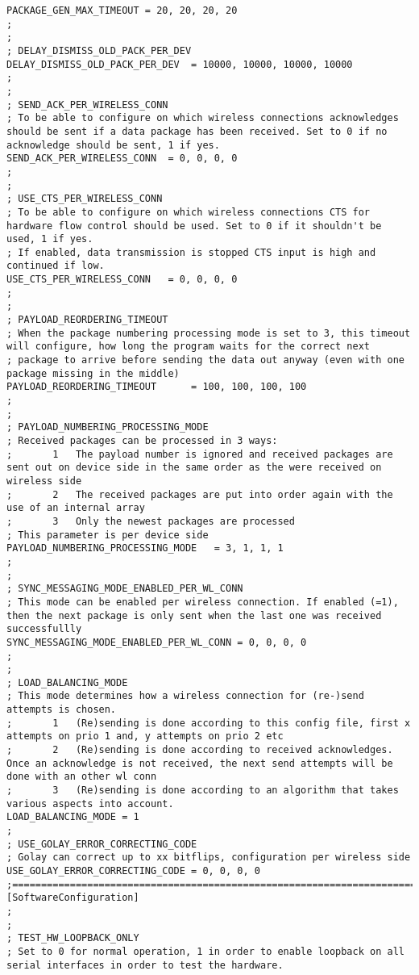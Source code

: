 \begin{lstlisting}
PACKAGE_GEN_MAX_TIMEOUT	= 20, 20, 20, 20
;
;
; DELAY_DISMISS_OLD_PACK_PER_DEV
DELAY_DISMISS_OLD_PACK_PER_DEV	= 10000, 10000, 10000, 10000
;
;
; SEND_ACK_PER_WIRELESS_CONN
; To be able to configure on which wireless connections acknowledges should be sent if a data package has been received. Set to 0 if no acknowledge should be sent, 1 if yes.
SEND_ACK_PER_WIRELESS_CONN	= 0, 0, 0, 0
;
;
; USE_CTS_PER_WIRELESS_CONN
; To be able to configure on which wireless connections CTS for hardware flow control should be used. Set to 0 if it shouldn't be used, 1 if yes.
; If enabled, data transmission is stopped CTS input is high and continued if low.
USE_CTS_PER_WIRELESS_CONN	= 0, 0, 0, 0
;
;
; PAYLOAD_REORDERING_TIMEOUT
; When the package numbering processing mode is set to 3, this timeout will configure, how long the program waits for the correct next
; package to arrive before sending the data out anyway (even with one package missing in the middle)
PAYLOAD_REORDERING_TIMEOUT		= 100, 100, 100, 100
;
;
; PAYLOAD_NUMBERING_PROCESSING_MODE
; Received packages can be processed in 3 ways:
; 		1	The payload number is ignored and received packages are sent out on device side in the same order as the were received on wireless side
;		2	The received packages are put into order again with the use of an internal array
;		3	Only the newest packages are processed
; This parameter is per device side
PAYLOAD_NUMBERING_PROCESSING_MODE	= 3, 1, 1, 1
;
;
; SYNC_MESSAGING_MODE_ENABLED_PER_WL_CONN
; This mode can be enabled per wireless connection. If enabled (=1), then the next package is only sent when the last one was received successfullly
SYNC_MESSAGING_MODE_ENABLED_PER_WL_CONN	= 0, 0, 0, 0
;
;
; LOAD_BALANCING_MODE
; This mode determines how a wireless connection for (re-)send attempts is chosen.
;		1	(Re)sending is done according to this config file, first x attempts on prio 1 and, y attempts on prio 2 etc
;		2	(Re)sending is done according to received acknowledges. Once an acknowledge is not received, the next send attempts will be done with an other wl conn
;		3	(Re)sending is done according to an algorithm that takes various aspects into account.
LOAD_BALANCING_MODE = 1
;
; USE_GOLAY_ERROR_CORRECTING_CODE
; Golay can correct up to xx bitflips, configuration per wireless side
USE_GOLAY_ERROR_CORRECTING_CODE = 0, 0, 0, 0
;===================================================================================================================================
[SoftwareConfiguration]
;
;
; TEST_HW_LOOPBACK_ONLY
; Set to 0 for normal operation, 1 in order to enable loopback on all serial interfaces in order to test the hardware.

\end{lstlisting}
